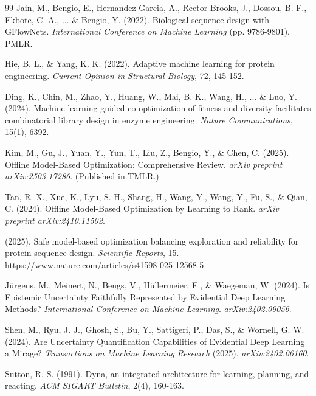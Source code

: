 \documentclass[12pt, a4paper]{article}
\begin{document}
\begin{thebibliography}{99}
Jain, M., Bengio, E., Hernandez-Garcia, A., Rector-Brooks, J., Dossou, B. F., Ekbote, C. A., ... \& Bengio, Y. (2022). \newblock Biological sequence design with GFlowNets. \newblock \textit{International Conference on Machine Learning} (pp. 9786-9801). PMLR.


Hie, B. L., \& Yang, K. K. (2022). \newblock Adaptive machine learning for protein engineering. \newblock \textit{Current Opinion in Structural Biology}, 72, 145-152.


Ding, K., Chin, M., Zhao, Y., Huang, W., Mai, B. K., Wang, H., ... \& Luo, Y. (2024). \newblock Machine learning-guided co-optimization of fitness and diversity facilitates combinatorial library design in enzyme engineering. \newblock \textit{Nature Communications}, 15(1), 6392.


Kim, M., Gu, J., Yuan, Y., Yun, T., Liu, Z., Bengio, Y., \& Chen, C. (2025). \newblock Offline Model-Based Optimization: Comprehensive Review. \newblock \textit{arXiv preprint arXiv:2503.17286}. (Published in TMLR.)


Tan, R.-X., Xue, K., Lyu, S.-H., Shang, H., Wang, Y., Wang, Y., Fu, S., \& Qian, C. (2024). \newblock Offline Model-Based Optimization by Learning to Rank. \newblock \textit{arXiv preprint arXiv:2410.11502}.


(2025). \newblock Safe model-based optimization balancing exploration and reliability for protein sequence design. \newblock \textit{Scientific Reports}, 15. \url{https://www.nature.com/articles/s41598-025-12568-5}


J\"{u}rgens, M., Meinert, N., Bengs, V., H\"{u}llermeier, E., \& Waegeman, W. (2024). \newblock Is Epistemic Uncertainty Faithfully Represented by Evidential Deep Learning Methods? \newblock \textit{International Conference on Machine Learning}. \textit{arXiv:2402.09056}.


Shen, M., Ryu, J. J., Ghosh, S., Bu, Y., Sattigeri, P., Das, S., \& Wornell, G. W. (2024). \newblock Are Uncertainty Quantification Capabilities of Evidential Deep Learning a Mirage? \newblock \textit{Transactions on Machine Learning Research} (2025). \textit{arXiv:2402.06160}.


Sutton, R. S. (1991). \newblock Dyna, an integrated architecture for learning, planning, and reacting. \newblock \textit{ACM SIGART Bulletin}, 2(4), 160-163.



\end{thebibliography}
\end{document}
